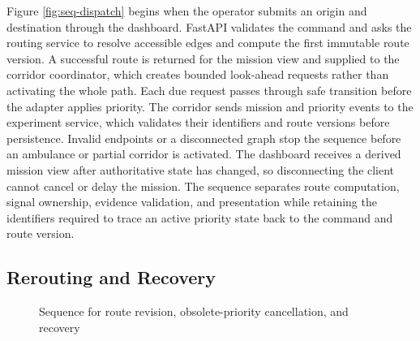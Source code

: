 Figure \ref{fig:seq-dispatch} begins when the operator submits an origin and destination through the dashboard. FastAPI validates the command and asks the routing service to resolve accessible edges and compute the first immutable route version. A successful route is returned for the mission view and supplied to the corridor coordinator, which creates bounded look-ahead requests rather than activating the whole path. Each due request passes through safe transition before the adapter applies priority. The corridor sends mission and priority events to the experiment service, which validates their identifiers and route versions before persistence. Invalid endpoints or a disconnected graph stop the sequence before an ambulance or partial corridor is activated. The dashboard receives a derived mission view after authoritative state has changed, so disconnecting the client cannot cancel or delay the mission. The sequence separates route computation, signal ownership, evidence validation, and presentation while retaining the identifiers required to trace an active priority state back to the command and route version.

\subsection{Rerouting and Recovery}

\begin{figure}[htbp]
\centering
{}
\caption{Sequence for route revision, obsolete-priority cancellation, and recovery}
\label{fig:seq-reroute}
\end{figure}


